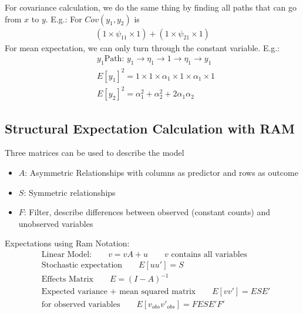 For covariance calculation, we do the same thing by finding all paths that can go from $x$ to $y$. E.g.: For $Cov(y_1, y_2)$ is 
    \begin{align*}
        \left( 1 \times \psi_{11} \times 1\right) + \left(1 \times \psi_{21} \times 1 \right)
    \end{align*}
For mean expectation, we can only turn through the constant variable. E.g.: 
    \begin{align*}
        & y_1 \text{Path: } y_1 \to \eta_1 \to 1 \to \eta_1 \to y_1 \\
        & E[y_1]^2 = 1 \times 1 \times \alpha_1 \times 1 \times \alpha_1 \times 1 \\
        & E[y_2]^2 = \alpha_1^2 + \alpha_2^2 + 2\alpha_1\alpha_2
    \end{align*}
    
\subsection{Structural Expectation Calculation with RAM} 
Three matrices can be used to describe the model
    \begin{itemize}
        \item $A$: Asymmetric Relationships with columns as predictor and rows as outcome
        \item $S$: Symmetric relationships 
        \item $F$: Filter, describe differences between observed (constant counts) and unobserved variables 
    \end{itemize}
Expectations using Ram Notation: 
    \begin{align*}
        & \text{Linear Model:} \qquad v = vA + u \qquad \text{$v$ contains all variables} \\
        & \text{Stochastic expectation} \qquad E[uu'] = S \\
        & \text{Effects Matrix} \qquad E = (I-A)^{-1} \\
        & \text{Expected variance + mean squared matrix} \qquad E[vv'] = ESE'\\
        & \text{for observed variables} \qquad E[v_{obs}v'_{obs}] =  FESE'F'
    \end{align*}

